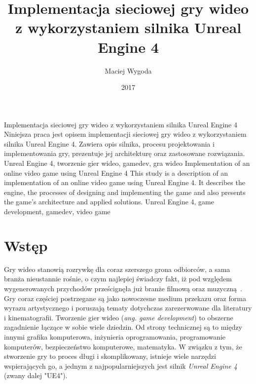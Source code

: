 \documentclass[multip]{SGGW-thesis}
\title{Implementacja sieciowej gry wideo z wykorzystaniem silnika Unreal Engine 4}
\author{Maciej Wygoda}
\date{2017}
\begin{document}
\maketitle
{}
\statementpage
\abstractpage
{Implementacja sieciowej gry wideo z wykorzystaniem silnika Unreal Engine 4}
{Niniejsza praca jest opisem implementacji sieciowej gry wideo z wykorzystaniem silnika Unreal Engine 4. Zawiera opis silnika, procesu projektowania i implementowania gry, prezentuje jej architekturę oraz zastosowane rozwiązania.}
{Unreal Engine 4, tworzenie gier wideo, gamedev, gra wideo}
{Implementation of an online video game using Unreal Engine 4}
{This study is a description of an implementation of an online video game using Unreal Engine 4. It describes the engine, the processes of designing and implementing the game and also presents the game's architecture and applied solutions.}
{Unreal Engine 4, game development, gamedev, video game}

\tableofcontents

\chapter{Wstęp}
Gry wideo stanowią rozrywkę dla coraz szerszego grona odbiorców, a sama branża nieustannie rośnie, o czym najlepiej świadczy fakt, iż pod względem wygenerowanych przychodów prześcignęła już branże filmową oraz muzyczną~\cite{nasdaq-video-games-industry}. Gry coraz częściej postrzegane są jako nowoczesne medium przekazu oraz forma wyrazu artystycznego i poruszają tematy dotychczas zarezerwowane dla literatury i kinematografii. 
\newline Tworzenie gier wideo ({\em ang. game development}) to obszerne zagadnienie łączące w sobie wiele dziedzin. Od strony technicznej są to między innymi grafika komputerowa, inżynieria oprogramowania, programowanie komputerów, bezpieczeństwo komputerowe, matematyka. W związku z tym, że stworzenie gry to proces długi i skomplikowany, istnieje wiele narzędzi wspierających go, a jednym z najpopularniejszych jest silnik {\em Unreal Engine 4} (zwany dalej "UE4").
\end{document}
